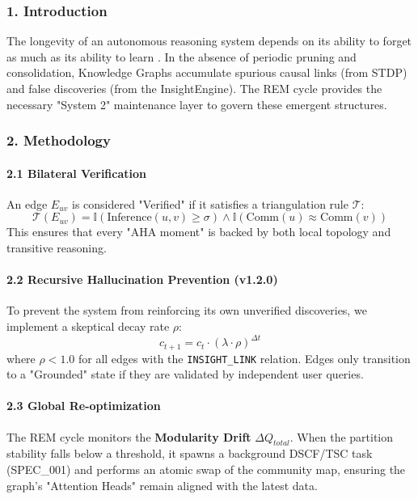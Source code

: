 \documentclass[10pt,journal,compsoc]{IEEEtran}
\begin{document}
\subsubsection{1. Introd\-uction}
The longevity of an autonomous reasoning system depends on its ability to forget as much as its ability to learn \cite{diekelmann2010memory}. In the absence of periodic pruning and conso\-lidation, Knowledge Graphs accumulate spurious causal links (from STDP) and false discoveries (from the InsightEngine). The REM cycle provides the necessary "System 2" maintenance layer to govern these emergent structures.

\subsubsection{2. Methodology}

\paragraph{2.1 Bilateral Verifi\-cation}
An edge $E_{uv}$ is considered "Verified" if it satisfies a trian\-gulation rule $\mathcal{T}$:
\begin{equation}
\mathcal{T}(E_{uv}) = \mathbb{I}(\text{Inference}(u,v) \geq \sigma) \land \mathbb{I}(\text{Comm}(u) \approx \text{Comm}(v))
\end{equation}
This ensures that every "AHA moment" is backed by both local topology and transitive reasoning.

\paragraph{2.2 Recursive Halluc\-ination Prevention (v1.2.0)}
To prevent the system from reinforcing its own unverified discoveries, we implement a skeptical decay rate $\rho$:
\begin{equation}
c_{t+1} = c_t \cdot (\lambda \cdot \rho)^{\Delta t}
\end{equation}
where $\rho < 1.0$ for all edges with the \texttt{INSIGHT\_LINK} relation. Edges only transition to a "Grounded" state if they are validated by independent user queries.

\paragraph{2.3 Global Re-optim\-ization}
The REM cycle monitors the \textbf{Modularity Drift} $\Delta Q_{total}$. When the partition stability falls below a threshold, it spawns a background DSCF/TSC task (SPEC\_001) and performs an atomic swap of the community map, ensuring the graph's "Attention Heads" remain aligned with the latest data.
\end{document}
